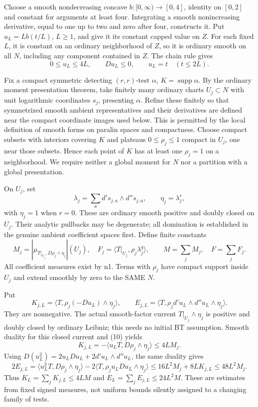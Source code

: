 \documentclass[11pt]{article}
\begin{document}
Choose a smooth nondecreasing concave \(b:[0,\infty)\to[0,4]\), identity on \([0,2]\) and constant for arguments at least four. Integrating a smooth nonincreasing derivative, equal to one up to two and zero after four, constructs it. Put \(u_L=L b(t/L)\), \(L\geq1\), and give it its constant capped value on \(Z\). For each fixed \(L\), it is constant on an ordinary neighborhood of \(Z\), so it is ordinary smooth on all \(N\), including any component contained in \(Z\). The chain rule gives
\[
 0\leq u_L\leq4L,\qquad Du_L\leq0,\qquad u_L=t\quad(t\leq2L).             \tag{10}
\]

Fix a compact symmetric detecting \((r,r)\)-test \(\alpha\), \(K=\operatorname{supp}\alpha\). By the ordinary moment presentation theorem, take finitely many ordinary charts \(U_j\subset N\) with unit logarithmic coordinates \(s_j\), presenting \(\alpha\). Refine these finitely so that symmetrized smooth ambient representatives and their derivatives are defined near the compact coordinate images used below. This is permitted by the local definition of smooth forms on paralin spaces and compactness. Choose compact subsets with interiors covering \(K\) and plateaus \(0\leq\rho_j\leq1\) compact in \(U_j\), one near those subsets. Hence each point of \(K\) has at least one \(\rho_j=1\) on a neighborhood. We require neither a global moment for \(N\) nor a partition with a global presentation.

On \(U_j\), set
\[
 \lambda_j=\sum_a d's_{j,a}\wedge d''s_{j,a},\qquad\eta_j=\lambda_j^r,
\]
with \(\eta_j=1\) when \(r=0\). These are ordinary smooth positive and doubly closed on \(U_j\). Their analytic pullbacks may be degenerate; all domination is established in the genuine ambient coefficient spaces first. Define finite constants
\[
 M_j=|\mu_{T|_{U_j},D\rho_j\wedge\eta_j}|(U_j),\quad
 F_j=\langle T|_{U_j},\rho_j\lambda_j^q\rangle,\qquad
 M=\sum_jM_j,\quad F=\sum_jF_j.
\]
All coefficient measures exist by n1. Terms with \(\rho_j\) have compact support inside \(U_j\) and extend smoothly by zero to the SAME \(N\).

Put
\[
 K_{j,L}=\langle T,\rho_j(-Du_L)\wedge\eta_j\rangle,\qquad
 E_{j,L}=\langle T,\rho_j d'u_L\wedge d''u_L\wedge\eta_j\rangle.
\]
They are nonnegative. The actual smooth-factor current \(T|_{U_j}\wedge\eta_j\) is positive and doubly closed by ordinary Leibniz; this needs no initial BT assumption. Smooth duality for this closed current and (10) yields
\[
 K_{j,L}=-\langle u_LT,D\rho_j\wedge\eta_j\rangle\leq4LM_j.                \tag{11}
\]
Using \(D(u_L^2)=2u_LDu_L+2d'u_L\wedge d''u_L\), the same duality gives
\[
 2E_{j,L}=\langle u_L^2T,D\rho_j\wedge\eta_j\rangle
       -2\langle T,\rho_j u_LDu_L\wedge\eta_j\rangle
 \leq16L^2M_j+8LK_{j,L}\leq48L^2M_j.                                    \tag{12}
\]
Thus \(K_L=\sum_jK_{j,L}\leq4LM\) and \(E_L=\sum_jE_{j,L}\leq24L^2M\). These are estimates from fixed signed measures, not uniform bounds silently assigned to a changing family of tests.
\end{document}

